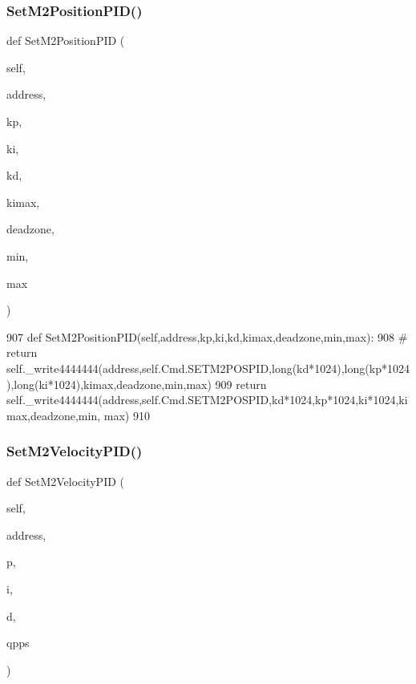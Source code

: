 \subsubsection{\texorpdfstring{Set\+M2\+Position\+P\+I\+D()}{SetM2PositionPID()}}
{\footnotesize\ttfamily def Set\+M2\+Position\+P\+ID (\begin{DoxyParamCaption}\item[{}]{self,  }\item[{}]{address,  }\item[{}]{kp,  }\item[{}]{ki,  }\item[{}]{kd,  }\item[{}]{kimax,  }\item[{}]{deadzone,  }\item[{}]{min,  }\item[{}]{max }\end{DoxyParamCaption})}


\begin{DoxyCode}
907     \textcolor{keyword}{def }SetM2PositionPID(self,address,kp,ki,kd,kimax,deadzone,min,max):
908 \textcolor{comment}{#       return
       self.\_write4444444(address,self.Cmd.SETM2POSPID,long(kd*1024),long(kp*1024),long(ki*1024),kimax,deadzone,min,max)}
909         \textcolor{keywordflow}{return} self.\_write4444444(address,self.Cmd.SETM2POSPID,kd*1024,kp*1024,ki*1024,kimax,deadzone,min,
      max)
910 
\end{DoxyCode}
\mbox{\label{classtoxic__hardware_1_1roboclaw__3_1_1Roboclaw_aea08bdecff46652920d96fc6239ae604}} 
\subsubsection{\texorpdfstring{Set\+M2\+Velocity\+P\+I\+D()}{SetM2VelocityPID()}}
{\footnotesize\ttfamily def Set\+M2\+Velocity\+P\+ID (\begin{DoxyParamCaption}\item[{}]{self,  }\item[{}]{address,  }\item[{}]{p,  }\item[{}]{i,  }\item[{}]{d,  }\item[{}]{qpps }\end{DoxyParamCaption})}


